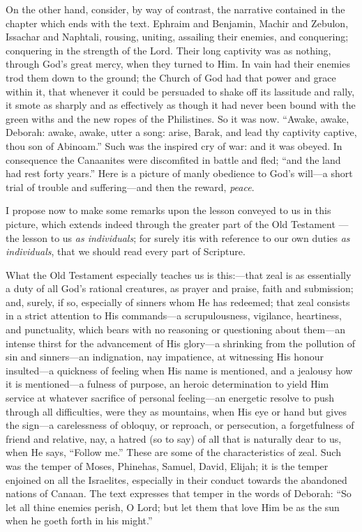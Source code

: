 On the other hand, consider, by way of contrast, the narrative
contained in the chapter which ends with the text. Ephraim and
Benjamin, Machir and Zebulon, Issachar and Naphtali, rousing, uniting,
assailing their enemies, and conquering; conquering in the strength of
the Lord. Their long captivity was as nothing, through God's great
mercy, when they turned to Him. In vain had their enemies trod them
down to the ground; the Church of God had that power and grace within
it, that whenever it could be persuaded to shake off its lassitude and
rally, it smote as sharply and as effectively as though it had never
been bound with the green withs and the new ropes of the Philistines.
So it was now. ``Awake, awake, Deborah: awake, awake, utter a
song: arise, Barak, and lead thy captivity captive, thou son of
Abinoam.'' Such was the inspired cry of war: and it was obeyed. In
consequence the Canaanites were discomfited in battle and fled;
``and the land had rest forty years.'' Here is a picture of
manly obedience to God's will—a short trial of trouble and
suffering—and then the reward, \emph{peace}.

I propose now to make some remarks upon the lesson conveyed to us
in this picture, which extends indeed through the greater part of the
Old Testament —the lesson to us \emph{as individuals}; for surely it\emph{}is with reference to our own duties \emph{as individuals}, that we
should read every part of Scripture.

What the Old Testament especially teaches us is this:—that zeal
is as essentially a duty of all God's rational creatures, as prayer
and praise, faith and submission; and, surely, if so, especially of
sinners whom He has redeemed; that zeal consists in a strict attention
to His commands—a scrupulousness, vigilance, heartiness, and
punctuality, which bears with no reasoning or questioning about them—an
intense thirst for the advancement of His glory—a shrinking from the
pollution of sin and sinners—an indignation, nay impatience, at
witnessing His honour insulted—a quickness of feeling when His name
is mentioned, and a jealousy how it is mentioned—a fulness of
purpose, an heroic determination to yield Him service at whatever
sacrifice of personal feeling—an energetic resolve to push through
all difficulties, were they as mountains, when His eye or hand but
gives the sign—a carelessness of obloquy, or reproach, or
persecution, a forgetfulness of friend and relative, nay, a hatred (so
to say) of all that is naturally dear to us, when He says,
``Follow me.'' These are some of the characteristics of zeal.
Such was the temper of Moses, Phinehas, Samuel, David, Elijah; it is
the temper enjoined on all the Israelites, especially in their conduct
towards the abandoned nations of Canaan. The text expresses that
temper in the words of Deborah: ``So let all thine enemies perish,
O Lord; but let them that love Him be as the sun when he goeth forth
in his might.''

